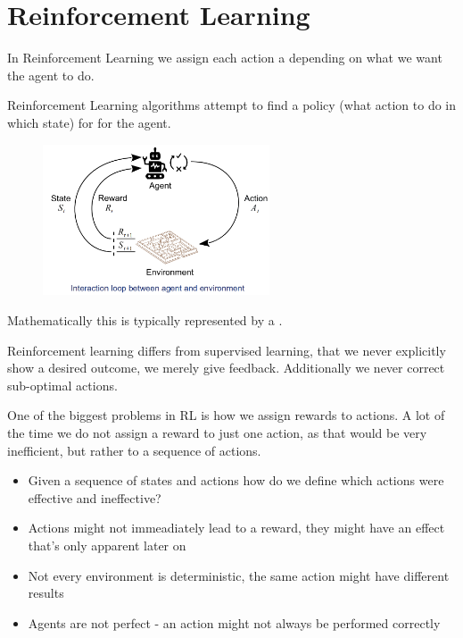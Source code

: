 \documentclass[
../../EiKI_Summary.tex,
]
{subfiles}
\begin{document}
\section{Reinforcement Learning}
In Reinforcement Learning we assign each action a  depending on what we want the agent to do.

Reinforcement Learning algorithms attempt to find a policy (what action to do in which state) for  for the agent. 

\begin{figure}
    [H]
    \centering
    \includegraphics[width=0.6\textwidth]{Pics/12/ReinforcementLearningIdea.png}
\end{figure}

Mathematically this is typically represented by a .

Reinforcement learning differs from supervised learning, that we never explicitly show a desired outcome, we merely give feedback. Additionally we never correct sub-optimal actions.

One of the biggest problems in RL is how we assign rewards to actions. A lot of the time we do not assign a reward to just one action, as that would be very inefficient, but rather to a sequence of actions.

\begin{itemize}
    \item Given a sequence of states and actions how do we define which actions were effective and ineffective?
    \item Actions might not immeadiately lead to a reward, they might have an effect that's only apparent later on
    \item Not every environment is deterministic, the same action might have different results
    \item Agents are not perfect - an action might not always be performed correctly
\end{itemize}
\end{document}
